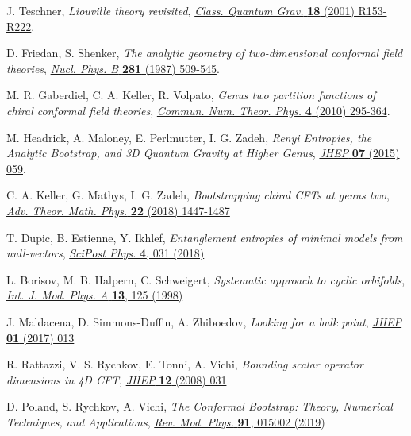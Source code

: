 \documentclass[a4paper,11pt]{article}
\begin{document}
\begin{thebibliography}{99}
 J. Teschner, \emph{Liouville theory revisited}, \href{https://doi.org/10.1088/0264-9381/18/23/201}{\emph{Class. Quantum Grav.} {\bf 18} (2001) R153-R222}.

 D. Friedan, S. Shenker, \emph{The analytic geometry of two-dimensional conformal field theories}, \href{https://doi.org/10.1016/0550-3213(87)90418-4}{\emph{Nucl. Phys. B} {\bf 281} (1987) 509-545}.

 M. R. Gaberdiel, C. A. Keller, R. Volpato, \emph{Genus two partition functions of chiral conformal field theories},
\href{https://dx.doi.org/10.4310/CNTP.2010.v4.n2.a2}{\emph{Commun. Num. Theor. Phys.} {\bf 4} (2010) 295-364}.

 M. Headrick, A. Maloney, E. Perlmutter, I. G. Zadeh, \emph{Renyi Entropies, the Analytic Bootstrap, and 3D Quantum Gravity at Higher Genus}, \href{https://doi.org/10.1007/JHEP07(2015)059}{\emph{JHEP} {\bf 07} (2015) 059}.

 C. A. Keller, G. Mathys, I. G. Zadeh, \emph{Bootstrapping chiral CFTs at genus two},
\href{https://dx.doi.org/10.4310/ATMP.2018.v22.n6.a3}{\emph{Adv. Theor. Math. Phys.} {\bf 22} (2018) 1447-1487}

 T. Dupic, B. Estienne, Y. Ikhlef, \emph{Entanglement entropies of minimal models from null-vectors}, 
\href{https://scipost.org/10.21468/SciPostPhys.4.6.031}{\emph{SciPost Phys.} {\bf 4}, 031 (2018)}

 L. Borisov, M. B. Halpern, C. Schweigert, \emph{Systematic approach to cyclic orbifolds}, 
\href{https://doi.org/10.1142/S0217751X98000044}{\emph{Int. J. Mod. Phys. A} {\bf 13}, 125 (1998)}

 J. Maldacena, D. Simmons-Duffin, A. Zhiboedov, \emph{Looking for a bulk point},
\href{ https://doi.org/10.1007/JHEP01(2017)013}{\emph{JHEP} {\bf 01} (2017) 013}

 R. Rattazzi, V. S. Rychkov, E. Tonni, A. Vichi, \emph{Bounding scalar operator dimensions in 4D CFT},
\href{https://doi.org/10.1088/1126-6708/2008/12/031}{\emph{JHEP} {\bf 12} (2008) 031}

 D. Poland, S. Rychkov, A. Vichi, \emph{The Conformal Bootstrap: Theory, Numerical Techniques, and Applications},
\href{https://doi.org/10.1103/RevModPhys.91.015002}{\emph{Rev. Mod. Phys.} {\bf 91}, 015002 (2019)}




\end{thebibliography}
\end{document}
